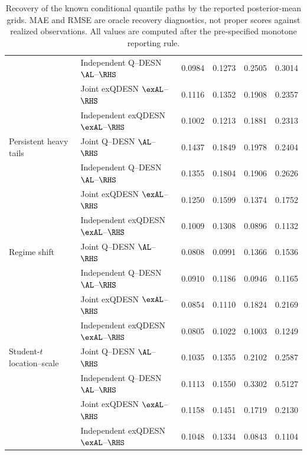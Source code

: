 \begin{table}[p]
{\begin{tabular}{@{}>{\raggedright\arraybackslash}p{}>{\raggedright\arraybackslash}p{}rrrr@{}}
 & Independent Q--DESN \(\AL\)--\(\RHS\) & 0.0984 & 0.1273 & 0.2505 & 0.3014 \\
 & Joint exQDESN \(\exAL\)--\(\RHS\) & 0.1116 & 0.1352 & 0.1908 & 0.2357 \\
 & Independent exQDESN \(\exAL\)--\(\RHS\) & 0.1002 & 0.1213 & 0.1881 & 0.2313 \\
\addlinespace[2pt]
Persistent heavy tails & Joint Q--DESN \(\AL\)--\(\RHS\) & 0.1437 & 0.1849 & 0.1978 & 0.2404 \\
 & Independent Q--DESN \(\AL\)--\(\RHS\) & 0.1355 & 0.1804 & 0.1906 & 0.2626 \\
 & Joint exQDESN \(\exAL\)--\(\RHS\) & 0.1250 & 0.1599 & 0.1374 & 0.1752 \\
 & Independent exQDESN \(\exAL\)--\(\RHS\) & 0.1009 & 0.1308 & 0.0896 & 0.1132 \\
\addlinespace[2pt]
Regime shift & Joint Q--DESN \(\AL\)--\(\RHS\) & 0.0808 & 0.0991 & 0.1366 & 0.1536 \\
 & Independent Q--DESN \(\AL\)--\(\RHS\) & 0.0910 & 0.1186 & 0.0946 & 0.1165 \\
 & Joint exQDESN \(\exAL\)--\(\RHS\) & 0.0854 & 0.1110 & 0.1824 & 0.2169 \\
 & Independent exQDESN \(\exAL\)--\(\RHS\) & 0.0805 & 0.1022 & 0.1003 & 0.1249 \\
\addlinespace[2pt]
Student-\(t\) location--scale & Joint Q--DESN \(\AL\)--\(\RHS\) & 0.1035 & 0.1355 & 0.2102 & 0.2587 \\
 & Independent Q--DESN \(\AL\)--\(\RHS\) & 0.1113 & 0.1550 & 0.3302 & 0.5127 \\
 & Joint exQDESN \(\exAL\)--\(\RHS\) & 0.1158 & 0.1451 & 0.1719 & 0.2130 \\
 & Independent exQDESN \(\exAL\)--\(\RHS\) & 0.1048 & 0.1334 & 0.0843 & 0.1104 \\
\bottomrule
\end{tabular}
}%
\caption{Recovery of the known conditional quantile paths by the reported posterior-mean grids. MAE and RMSE are oracle recovery diagnostics, not proper scores against realized observations. All values are computed after the pre-specified monotone reporting rule.}
\label{tab:supp-joint-qdesn-corrected-v4-oracle}
\end{table}
